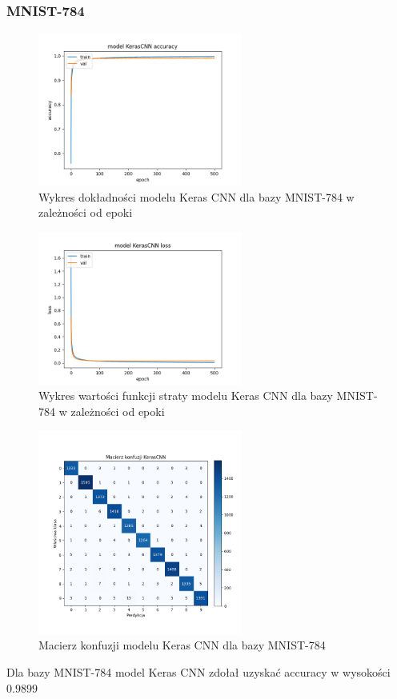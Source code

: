 \documentclass{article}
\begin{document}
\subsubsection{MNIST-784}
\begin{figure}[H]
    \centering
    \includegraphics[width=0.6\textwidth]{../Saves/KerasCNN/mnist-784/KerasCNN_mnist_784_ep500_acc.png}
    \caption{Wykres dokładności modelu Keras CNN dla bazy MNIST-784 w zależności od epoki}
\end{figure}

\begin{figure}[H]
    \centering
    \includegraphics[width=0.6\textwidth]{../Saves/KerasCNN/mnist-784/KerasCNN_mnist_784_ep500_loss.png}
    \caption{Wykres wartości funkcji straty modelu Keras CNN dla bazy MNIST-784 w zależności od epoki} 
\end{figure}

\begin{figure}[H]
	\centering
	\includegraphics[width=0.6\textwidth]{../Saves/KerasCNN/mnist-784/KerasCNN_mnist_784_conf_mat.png}
	\caption{Macierz konfuzji modelu Keras CNN dla bazy MNIST-784}
\end{figure}
Dla bazy MNIST-784 model Keras CNN zdołał uzyskać accuracy w wysokości $0.9899$
\end{document}
